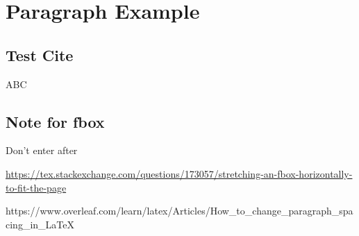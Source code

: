 \clearpage
\section{Paragraph Example}

\subsection{Test Cite}

ABC \cite{dirac}

\subsection{Note for fbox}

\begingroup

Don't enter after 

\url{https://tex.stackexchange.com/questions/173057/stretching-an-fbox-horizontally-to-fit-the-page}

https://www.overleaf.com/learn/latex/Articles/How\_to\_change\_paragraph\_spacing\_in\_LaTeX

\endgroup

\lipsum[1-1]

\begin{spacing}{1.5}
\lipsum[1-1]
\end{spacing}

\lipsum[1-1]
